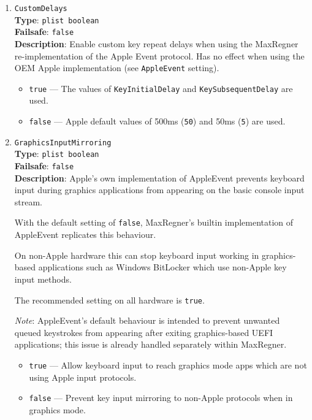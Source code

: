 \documentclass[]{article}
\providecommand{\tightlist}{%
  \setlength{\itemsep}{0pt}\setlength{\parskip}{0pt}}
\begin{document}
\begin{enumerate}
\item
  \texttt{CustomDelays}\\
  \textbf{Type}: \texttt{plist\ boolean}\\
  \textbf{Failsafe}: \texttt{false}\\
  \textbf{Description}: Enable custom key repeat delays when using the MaxRegner re-implementation
  of the Apple Event protocol.
  Has no effect when using the OEM Apple implementation (see \texttt{AppleEvent} setting).

  \begin{itemize}
  \tightlist
  \item \texttt{true} --- The values of \texttt{KeyInitialDelay} and \texttt{KeySubsequentDelay} are used.
  \item \texttt{false} --- Apple default values of 500ms (\texttt{50}) and 50ms (\texttt{5}) are used.
  \end{itemize}

\item
  \texttt{GraphicsInputMirroring}\\
  \textbf{Type}: \texttt{plist\ boolean}\\
  \textbf{Failsafe}: \texttt{false}\\
  \textbf{Description}:
  Apple’s own implementation of AppleEvent prevents keyboard input during graphics applications from appearing
  on the basic console input stream.

  With the default setting of \texttt{false}, MaxRegner's builtin implementation of AppleEvent replicates this behaviour.

  On non-Apple hardware this can stop keyboard input working in graphics-based applications such as Windows BitLocker
  which use non-Apple key input methods.

  The recommended setting on all hardware is \texttt{true}.

  \emph{Note}: AppleEvent's default behaviour is intended to prevent unwanted queued keystrokes from appearing
  after exiting graphics-based UEFI applications; this issue is already handled separately within MaxRegner.

  \begin{itemize}
  \tightlist
  \item \texttt{true} --- Allow keyboard input to reach graphics mode apps which are not using Apple input protocols.
  \item \texttt{false} --- Prevent key input mirroring to non-Apple protocols when in graphics mode.
  \end{itemize}


\end{enumerate}
\end{document}
